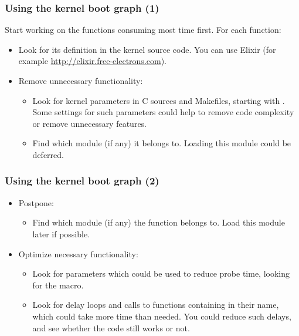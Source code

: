 \begin{frame}
\frametitle{Using the kernel boot graph (1)}
Start working on the functions consuming most time first. For each
function:
\begin{itemize}
\item Look for its definition in the kernel source code. You can use
      Elixir (for example \url{http://elixir.free-electrons.com}).
\item Remove unnecessary functionality:
      \begin{itemize}
      \item Look for kernel parameters in C sources and Makefiles, starting
      with . Some settings for such parameters could help
      to remove code complexity or remove unnecessary features.
      \item Find which module (if any) it belongs to. Loading this module
            could be deferred.
      \end{itemize}
\end{itemize}
\end{frame}

\begin{frame}
\frametitle{Using the kernel boot graph (2)}
\begin{itemize}
\item Postpone:
      \begin{itemize}
      \item Find which module (if any) the function belongs to.
            Load this module later if possible.
      \end{itemize}
\item Optimize necessary functionality:
      \begin{itemize}
      \item Look for parameters which could be used to reduce probe time,
            looking for the  macro.
      \item Look for delay loops and calls to functions containing
             in their name, which could take more time than
            needed. You could reduce such delays, and see whether the
            code still works or not.
      \end{itemize}
\end{itemize}
\end{frame}

